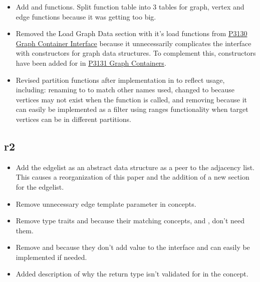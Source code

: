 \begin{itemize}
      \item Add  and  functions. Split function table into 3 tables for graph,
            vertex and edge functions because it was getting too big.
      \item Removed the Load Graph Data section with it's load functions from \href{https://www.wg21.link/P3130}{P3130 Graph Container Interface}
            because it unnecessarily complicates the interface with constructors for graph data structures. To complement this, constructors have 
            been added for  in \href{https://www.wg21.link/P3131}{P3131 Graph Containers}.
      \item Revised partition functions after implementation in  to reflect usage, including: 
            renaming  
            to  to match other names used, changed  to 
            because vertices may not exist when the function is called, and removing  because it can easily be 
            implemented as a filter using ranges functionality when target vertices can be in different partitions.
\end{itemize}

\subsection*{\paperno r2}

\begin{itemize}
      \item Add the edgelist as an abstract data structure as a peer to the adjacency list. 
            This causes a reorganization of this paper and the addition of a new section for the edgelist.
      \item Remove unnecessary  edge template parameter in concepts. 
      \item Remove type traits  and  because 
            their matching concepts,  and , don't need them.
      \item Remove  and  because they don't add value to the interface
            and can easily be implemented if needed.
      \item Added description of why the return type isn't validated for  in the 
             concept.
\end{itemize}

